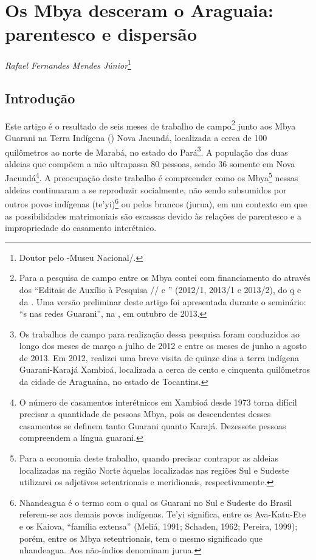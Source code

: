 \chapter{Os Mbya desceram o Araguaia: parentesco e dispersão}
\begin{flushright}
\emph{Rafael Fernandes Mendes Júnior}\footnote{Doutor pelo -Museu
Nacional/.}
\end{flushright}
\medskip

\section{Introdução}

Este artigo é o resultado de seis meses de trabalho de
campo\footnote{Para a pesquisa de campo entre os Mbya contei com
financiamento do  através dos ``Editais de Auxílio à Pesquisa
// e '' (2012/1, 2013/1 e 2013/2), do q e da .
Uma versão preliminar deste artigo foi apresentada durante o seminário:
``s nas redes Guarani'', na , em outubro de 2013.} junto aos Mbya
Guarani na Terra Indígena () Nova Jacundá, localizada a cerca de 100
quilômetros ao norte de Marabá, no estado do Pará\footnote{Os trabalhos
de campo para realização dessa pesquisa foram conduzidos ao longo dos
meses de março a julho de 2012 e entre os meses de junho a agosto de
2013. Em 2012, realizei uma breve visita de quinze dias a terra
indígena Guarani-Karajá Xambioá, localizada a cerca de cento e
cinquenta quilômetros da cidade de Araguaína, no estado de Tocantins.}.
A população das duas aldeias que compõem a  não ultrapassa 80
pessoas, sendo 36 somente em Nova Jacundá\footnote{O número de
casamentos interétnicos em Xambioá desde 1973 torna difícil precisar a
quantidade de pessoas Mbya, pois os descendentes desses casamentos se
definem tanto Guarani quanto Karajá. Dezessete pessoas compreendem a
língua guarani.}. A preocupação deste trabalho é compreender como os
Mbya\footnote{Para a economia deste trabalho, quando precisar contrapor
as aldeias localizadas na região Norte àquelas localizadas nas regiões
Sul e Sudeste utilizarei os adjetivos setentrionais e meridionais,
respectivamente.} nessas aldeias continuaram a se reproduzir
socialmente, não sendo subsumidos por outros povos indígenas
(te’yi)\footnote{Nhandeagua é o termo com o qual os Guarani no Sul e
Sudeste do Brasil referem-se aos demais povos indígenas. Te’yi
significa, entre os Ava-Katu-Ete e os Kaiova, ``família extensa'' (Meliá,
1991; Schaden, 1962; Pereira, 1999); porém, entre os Mbya setentrionais,
tem o mesmo significado que nhandeagua. Aos não-índios denominam
jurua.} ou pelos brancos (jurua), em um contexto em que as
possibilidades matrimoniais são escassas devido às relações de
parentesco e a impropriedade do casamento interétnico.

